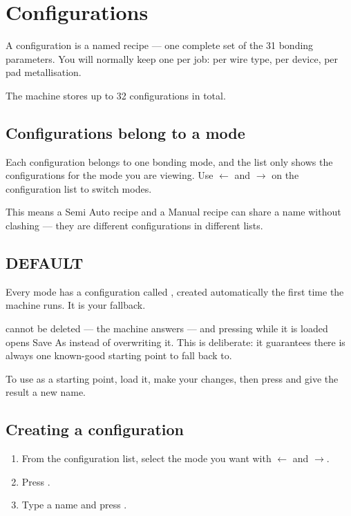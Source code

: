 \chapter{Configurations}
\label{ch:configurations}

A configuration is a named recipe --- one complete set of the 31 bonding
parameters. You will normally keep one per job: per wire type, per device, per
pad metallisation.

The machine stores up to 32 configurations in total.

\section{Configurations belong to a mode}

Each configuration belongs to one bonding mode, and the list only shows the
configurations for the mode you are viewing. Use $\leftarrow$ and $\rightarrow$
on the configuration list to switch modes.

\begin{wbnote}
This means a Semi Auto recipe and a Manual recipe can share a name without
clashing --- they are different configurations in different lists.
\end{wbnote}

\section{DEFAULT}

Every mode has a configuration called , created automatically
the first time the machine runs. It is your fallback.

\begin{wbnote}
 cannot be deleted --- the machine answers
 --- and pressing  while it is loaded
opens Save As instead of overwriting it. This is deliberate: it guarantees
there is always one known-good starting point to fall back to.
\end{wbnote}

To use  as a starting point, load it, make your changes, then
press  and give the result a new name.

\section{Creating a configuration}

\begin{enumerate}[leftmargin=*]
\item From the configuration list, select the mode you want with $\leftarrow$
  and $\rightarrow$.
\item Press .
\item Type a name and press .
\end{enumerate}

